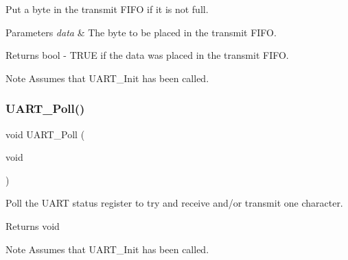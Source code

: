 Put a byte in the transmit F\+I\+FO if it is not full. 


\begin{DoxyParams}{Parameters}
{\em data} & The byte to be placed in the transmit F\+I\+FO. \\
\hline
\end{DoxyParams}
\begin{DoxyReturn}{Returns}
bool -\/ T\+R\+UE if the data was placed in the transmit F\+I\+FO. 
\end{DoxyReturn}
\begin{DoxyNote}{Note}
Assumes that U\+A\+R\+T\+\_\+\+Init has been called. 
\end{DoxyNote}
\mbox{\label{group__main__module_ga799b375101827a18f652a3f28ecefcd0}} 
\subsubsection{\texorpdfstring{U\+A\+R\+T\+\_\+\+Poll()}{UART\_Poll()}}
{\footnotesize\ttfamily void U\+A\+R\+T\+\_\+\+Poll (\begin{DoxyParamCaption}\item[{void}]{ }\end{DoxyParamCaption})}



Poll the U\+A\+RT status register to try and receive and/or transmit one character. 

\begin{DoxyReturn}{Returns}
void 
\end{DoxyReturn}
\begin{DoxyNote}{Note}
Assumes that U\+A\+R\+T\+\_\+\+Init has been called. 
\end{DoxyNote}
